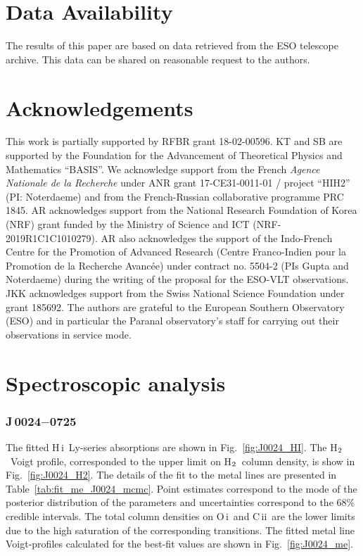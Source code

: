 \documentclass[fleqn,usenatbib,useAMS]{mnras}
\newcommand{\HH}{\mbox{H$\rm _2$}}
\newcommand{\HI}{H\,{\sc i}}
\newcommand{\CII}{C\,{\sc ii}}
\newcommand{\OI}{O\,{\sc i}}
\begin{document}
\section{Data Availability}
The results of this paper are based on data retrieved from the ESO telescope archive. This data can be shared on reasonable request to the authors.


\section*{Acknowledgements}
This work is partially supported by RFBR grant 18-02-00596. 
KT and SB are supported by the Foundation for the
Advancement of Theoretical Physics and Mathematics ``BASIS''. 
We acknowledge support from the French {\sl Agence Nationale de la Recherche} 
under ANR grant 17-CE31-0011-01 / project ``HIH2'' (PI: Noterdaeme) and from the French-Russian collaborative programme PRC 1845. AR acknowledges support from the National Research Foundation of Korea (NRF) grant funded by the Ministry of Science and ICT (NRF-2019R1C1C1010279). AR also acknowledges the support of the Indo-French Centre for the Promotion of Advanced Research (Centre Franco-Indien pour la Promotion de la Recherche Avanc\'ee) under contract no. 5504-2 (PIs Gupta and Noterdaeme) during the writing of the proposal for the ESO-VLT observations.
JKK acknowledges support from the Swiss National Science Foundation under grant 185692.
The authors are grateful to the European Southern Observatory (ESO) and in particular the Paranal observatory's staff for carrying out their observations in service mode. 




\bsp	%
\clearpage
\appendix

\section{Spectroscopic analysis}

\subsubsection{J\,0024$-$0725}

The fitted \HI\ Ly-series absorptions are shown in Fig.~\ref{fig:J0024_HI}. The \HH\ Voigt profile, corresponded to the upper limit on \HH\ column density, is show in Fig.~\ref{fig:J0024_H2}. The details of the fit to the metal lines are presented in Table~\ref{tab:fit_me_J0024_mcmc}. Point estimates correspond to the mode of the posterior distribution of the parameters and uncertainties correspond to the 68\% credible intervals. The total column densities on \OI\ and \CII\ are the lower limits due to the high saturation of the corresponding transitions. The fitted metal line Voigt-profiles calculated for the best-fit values are shown in Fig.~\ref{fig:J0024_me}. 
\end{document}
